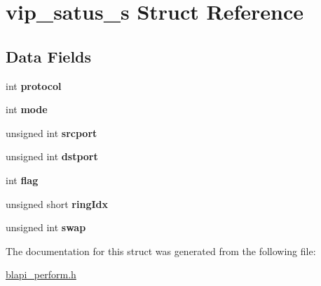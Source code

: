 \hypertarget{structvip__satus__s}{}\section{vip\+\_\+satus\+\_\+s Struct Reference}
\label{structvip__satus__s}
\subsection*{Data Fields}
\begin{DoxyCompactItemize}
\item 
\mbox{\label{structvip__satus__s_a4c92c6df5a1b8d67dd8ea94d4fc8e5bc}} 
int {\bfseries protocol}
\item 
\mbox{\label{structvip__satus__s_a68d9acc4d978d731bd8970a7935d970f}} 
int {\bfseries mode}
\item 
\mbox{\label{structvip__satus__s_abec9f2993c6f290b99f8836ba81cd94b}} 
unsigned int {\bfseries srcport}
\item 
\mbox{\label{structvip__satus__s_ad18b25d350b4d0c2a6a82fa0e934b3b8}} 
unsigned int {\bfseries dstport}
\item 
\mbox{\label{structvip__satus__s_a021f380c5fce6bd114e7bc1e69cfdf0c}} 
int {\bfseries flag}
\item 
\mbox{\label{structvip__satus__s_a2de9e46a9536c79861192fcd00362b2f}} 
unsigned short {\bfseries ring\+Idx}
\item 
\mbox{\label{structvip__satus__s_ad26b8108ee97fdc819e3af62a1baa536}} 
unsigned int {\bfseries swap}
\end{DoxyCompactItemize}


The documentation for this struct was generated from the following file\+:\begin{DoxyCompactItemize}
\item 
\hyperlink{blapi__perform_8h}{blapi\+\_\+perform.\+h}\end{DoxyCompactItemize}
